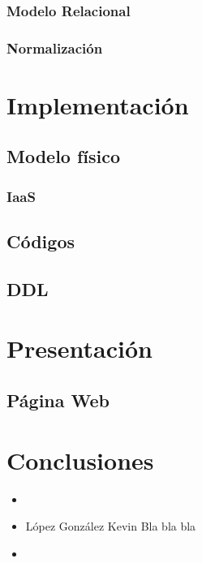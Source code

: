 \documentclass[12pt,letterpaper]{article}
\begin{document}
			\subsubsection{Modelo Relacional}
			
			\subsubsection{Normalización}
		
	\section{Implementación}
		\subsection{Modelo físico}
		
			\subsubsection{IaaS}
	
		\subsection{Códigos}
		
		\subsection{DDL}
	
	\section{Presentación}
		\subsection{Página Web}
	
	\section{Conclusiones}
		\begin{itemize}
			\item 
				\subitem 
				
			\item López González Kevin
				\subitem Bla bla bla

			\item 
				\subitem
		\end{itemize}

	
\end{document}
